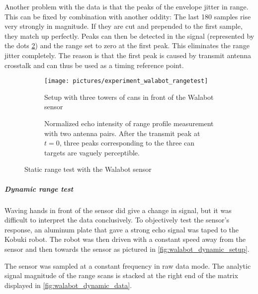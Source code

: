 Another problem with the data is that the peaks of the envelope jitter in range. This can be fixed by combination with another oddity: The last 180 samples rise very strongly in magnitude. If they are cut and prepended to the first sample, they match up perfectly. Peaks can then be detected in the signal (represented by the dots \cref{fig:walabot_rangetest_data}) and the range set to zero at the first peak. This eliminates the range jitter completely. The reason is that the first peak is caused by transmit antenna crosstalk and can thus be used as a timing reference point.

\begin{figure}[htbp]
    \centering
    \begin{subfigure}{\textwidth}
        \centering
        \texttt{[image: pictures/experiment\_walabot\_rangetest]}
        \caption{Setup with three towers of cans in front of the Walabot sensor}
        \label{fig:walabot_rangetest_setup}
    \end{subfigure}
    \begin{subfigure}{\textwidth}
        \centering
        \def\svgwidth{\linewidth}
        
        \caption{Normalized echo intensity of range profile measurement with two antenna pairs. After the transmit peak at \(t=0\), three peaks corresponding to the three can targets are vaguely perceptible. }
        \label{fig:walabot_rangetest_data}
    \end{subfigure}
    \caption{Static range test with the Walabot sensor}
    \label{fig:walabot_rangetest}
\end{figure}

\subparagraph{Dynamic range test}\label{dynamic-range-test}

Waving hands in front of the sensor did give a change in signal, but it
was difficult to interpret the data conclusively. To objectively test
the sensor's response, an aluminum plate that gave a strong echo signal
was taped to the Kobuki robot. The robot was then driven with a constant
speed away from the sensor and then towards the sensor as pictured in
\cref{fig:walabot_dynamic_setup}.

The sensor was sampled at a constant frequency in raw data mode. The
analytic signal magnitude of the range scans is stacked at the right end of the
matrix displayed in \cref{fig:walabot_dynamic_data}.

